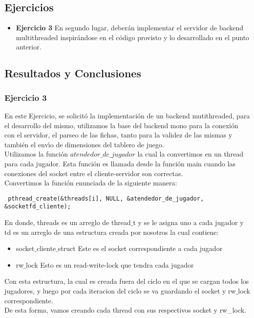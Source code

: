 
\subsection{Ejercicios}
\begin{itemize}
 \item 
\textbf{Ejercicio 3}
En segundo lugar, deberán implementar el servidor de backend multithreaded inspirándose en el código provisto y lo 
desarrollado en el punto anterior.
\end{itemize}

\subsection{Resultados y Conclusiones}


\subsubsection[Resolución Ejercicio 3]{Ejercicio 3}

\indent En este Ejercicio, se solicit\'{o} la implementación de un backend mutithreaded, para el desarrollo del mismo,
utilizamos la base del backend mono para la conexi\'{o}n con el servidor, el parseo de las fichas, tanto para la validez de las mismas
y tambi\'{e}n el env\'{\i}o de dimensiones del tablero de juego.\\

Utilizamos la función $atendedor\_de\_jugador$ la cual la convertimos en un thread para cada jugador. Esta función es llamada desde
la función main cuando las conexiones del socket entre el cliente-servidor son correctas. \\
Convertimos la función enunciada de la siguiente manera:\\
\begin{verbatim}
 pthread_create(&threads[i], NULL, &atendedor_de_jugador, &socketfd_cliente);
\end{verbatim}

En donde, threads es un arreglo de thread$\_$t y se le asigna uno a cada jugador y td es un arreglo de una estructura creada por
nosotros la cual contiene:
\begin{itemize}
 \item socket$\_$cliente$\_$struct Este es el socket correspondiente a cada jugador
 \item rw$\_$lock Esto es un read-write-lock que tendra cada jugador
\end{itemize}

Con esta estructura, la cual es creada fuera del ciclo en el que se cargan todos los jugadores, y luego por cada iteracion 
del ciclo se va guardando el socket y rw$\_$lock correspondiente.\\
De esta forma, vamos creando cada thread con sus respectivos socket y rw\_lock.\\

